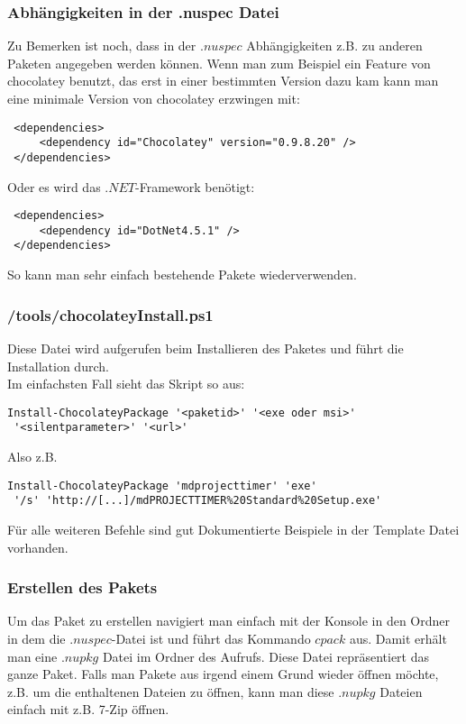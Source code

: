\documentclass[10pt,a4paper]{article}
\begin{document}
\subsubsection{Abhängigkeiten in der .nuspec Datei}
Zu Bemerken ist noch, dass in der $.nuspec$ Abhängigkeiten z.B. zu anderen Paketen angegeben werden können.
Wenn man zum Beispiel ein Feature von chocolatey benutzt, das erst in einer bestimmten Version dazu kam kann man eine minimale Version von chocolatey erzwingen mit:
\begin{lstlisting}
 <dependencies>
     <dependency id="Chocolatey" version="0.9.8.20" />
 </dependencies>
\end{lstlisting}
Oder es wird das $.NET$-Framework benötigt:
\begin{lstlisting}
 <dependencies>
     <dependency id="DotNet4.5.1" />
 </dependencies>
\end{lstlisting}

So kann man sehr einfach bestehende Pakete wiederverwenden.

\subsubsection{/tools/chocolateyInstall.ps1}
Diese Datei wird aufgerufen beim Installieren des Paketes und führt die Installation durch.
\\
Im einfachsten Fall sieht das Skript so aus:
\begin{lstlisting}
Install-ChocolateyPackage '<paketid>' '<exe oder msi>'
 '<silentparameter>' '<url>'
\end{lstlisting}
Also z.B.
\begin{lstlisting}
Install-ChocolateyPackage 'mdprojecttimer' 'exe'
 '/s' 'http://[...]/mdPROJECTTIMER%20Standard%20Setup.exe'
\end{lstlisting}

Für alle weiteren Befehle sind gut Dokumentierte Beispiele in der Template Datei vorhanden.

\subsubsection{Erstellen des Pakets}
Um das Paket zu erstellen navigiert man einfach mit der Konsole in den Ordner in dem die $.nuspec$-Datei ist und führt das Kommando $cpack$ aus. Damit erhält man eine $.nupkg$ Datei im Ordner des Aufrufs.
Diese Datei repräsentiert das ganze Paket. Falls man Pakete aus irgend einem Grund wieder öffnen möchte, z.B. um die enthaltenen Dateien zu öffnen, kann man diese $.nupkg$ Dateien einfach mit z.B. 7-Zip öffnen.
\end{document}
